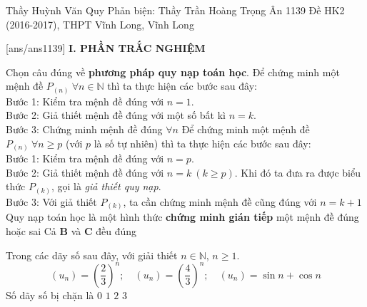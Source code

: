 \begin{name}
{Thầy Huỳnh Văn Quy \newline Phản biện: Thầy Trần Hoàng Trọng Ân}
{1139 Đề HK2 (2016-2017), THPT Vĩnh Long, Vĩnh Long}
	\end{name}
	\setcounter{ex}{0}\setcounter{bt}{0}
	[ans/ans1139]
\noindent\textbf{I. PHẦN TRẮC NGHIỆM}
\begin{ex}%
	Chọn câu đúng về \textbf{phương pháp quy nạp toán học}.
	\choice
	{Để chứng minh một mệnh đề $P_{(n)}\:\forall n\in\mathbb{N}$ thì ta thực hiện các bước sau đây:\\
		Bước 1: Kiểm tra mệnh đề đúng với $n=1$.\\
		Bước 2:	Giả thiết mệnh đề đúng với một số bất kì $n=k$.\\
		Bước 3:	Chứng minh mệnh đề đúng $\forall n$
		}
	{\True Để chứng minh một mệnh đề $P_{(n)}\:\forall n\geq p$ (với $p$ là số tự nhiên) thì ta thực hiện các bước sau đây:\\
		Bước 1: Kiểm tra mệnh đề đúng với $n=p$.\\
		Bước 2:	Giả thiết mệnh đề đúng với $n=k\:(k\geq p)$. Khi đó ta đưa ra được biểu thức $P_{(k)}$, gọi là \textit{giả thiết quy nạp}.\\
		Bước 3:	Với giả thiết $P_{(k)}$, ta cần chứng minh mệnh đề cũng đúng với $n=k+1$
	}
	{Quy nạp toán học là một hình thức \textbf{chứng minh gián tiếp} một mệnh đề đúng hoặc sai}
	{Cả \textbf{B} và \textbf{C} đều đúng}
\end{ex}

\begin{ex}%
	Trong các dãy số sau đây, với giải thiết $n\in\mathbb{N}$, $n\geq1$.
	\[(u_n)=\left(\dfrac{2}{3}\right)^n;\quad (u_n)=\left(\dfrac{4}{3}\right)^n;\quad (u_n)=\sin n+\cos n\]
	Số dãy số bị chặn là
	\choice
	{$0$}
	{$1$}
	{\True $2$}
	{$3$}
\end{ex}

